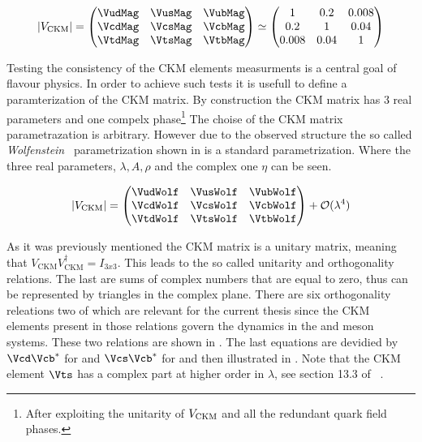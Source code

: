 \begin{equation}
  |V_{\text{CKM}}|
                   = \begin{pmatrix} \VudMag & \VusMag & \VubMag \\ \VcdMag & \VcsMag & \VcbMag \\ \VtdMag & \VtsMag & \VtbMag \end{pmatrix}
              \simeq \begin{pmatrix} 1 & 0.2 & 0.008 \\ 0.2 & 1 & 0.04 \\ 0.008 & 0.04 & 1 \end{pmatrix}
      \label{CKMmatrix}
  \end{equation}

Testing the consistency of the CKM elements measurments is a central goal of flavour physics.
In order to achieve such tests it is usefull to define a paramterization of the CKM matrix.
By construction the CKM matrix has 3 real parameters and one compelx phase\footnote{After exploiting the unitarity of $V_{\rm CKM}$ and all the redundant quark field phases.}
The choise of the CKM matrix parametrazation is arbitrary. However due to the observed structure the so called {\it Wolfenstein}~\cite{Wolfenstein:1983yz,Buras-wolfenstein}
parametrization shown in  is a standard parametrization. Where the three real parameters, $\lambda,A,\rho$
and the complex one $\eta$ can be seen.

\begin{equation}
  |V_{\text{CKM}}|
                   = \begin{pmatrix} \VudWolf & \VusWolf & \VubWolf \\
                                     \VcdWolf & \VcsWolf & \VcbWolf \\
                                     \VtdWolf & \VtsWolf & \VtbWolf \end{pmatrix} + \mathcal{O}(\lambda^4)
      \label{CKMwolfenstein}
\end{equation}

\noindent As it was previously mentioned the CKM matrix is a unitary matrix, meaning that $V_{\text{CKM}} V_{\text{CKM}}^\dagger = I_{3x3}$.
This leads to the so called unitarity and orthogonality relations. The last are sums of complex numbers that are equal to zero, thus can be
represented by triangles in the complex plane. There are six orthogonality releations two of which are relevant for the current thesis since
the CKM elements present in those relations govern the dynamics in the \Bs and \Bd meson systems. These two relations are shown in
. The last equations are devidied by $\Vcd\Vcb^*$ for \Bd and $\Vcs\Vcb^*$ for \Bs and then illustrated in .
Note that the CKM element $\Vts$ has a complex part at higher order in $\lambda$, see section 13.3 of ~\cite{PDG}.


